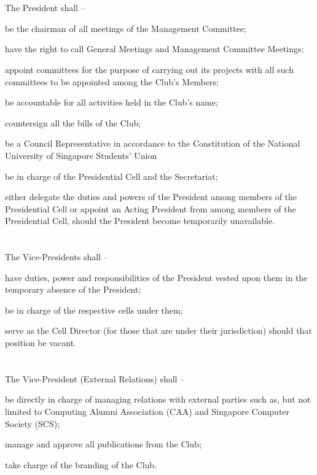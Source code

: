 
\section{}
The President shall –
	\begin{legal}
	\item be the chairman of all meetings of the Management Committee;
	\item have the right to call General Meetings and Management Committee Meetings;
	\item appoint committees for the purpose of carrying out its projects with all such committees to be appointed among the Club's Members;
	\item be accountable for all activities held in the Club's name;
	\item countersign all the bills of the Club;
	\item be a Council Representative in accordance to the Constitution of the National University of Singapore Students' Union
	\item be in charge of the Presidential Cell and the Secretariat;
	\item either delegate the duties and powers of the President among members of the Presidential Cell or appoint an Acting President from among members of the Presidential Cell, should the President become temporarily unavailable.
	\end{legal}

\section{}
The Vice-Presidents shall –
	\begin{legal}
	\item have duties, power and responsibilities of the President vested upon them in the temporary absence of the President;
	\item be in charge of the respective cells under them;
	\item serve as the Cell Director (for those that are under their jurisdiction) should that position be vacant.
	\end{legal}

\section{}
The Vice-President (External Relations) shall –
	\begin{legal}
	\item be directly in charge of managing relations with external parties such as, but not limited to Computing Alumni Association (CAA) and Singapore Computer Society (SCS);
	\item manage and approve all publications from the Club;
	\item take charge of the branding of the Club.
	\end{legal}

